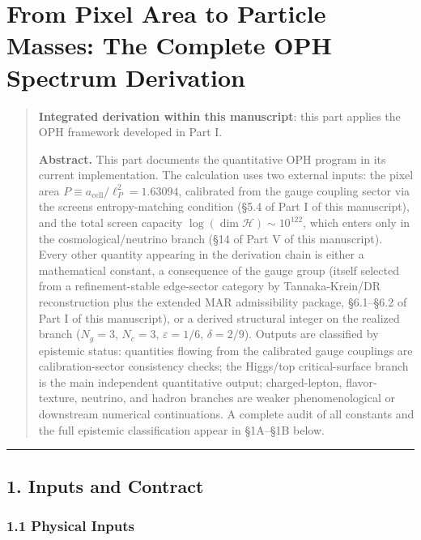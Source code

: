 \section{From Pixel Area to Particle Masses: The Complete OPH Spectrum Derivation}\label{from-pixel-area-to-particle-masses-the-complete-oph-spectrum-derivation}

\begin{quote}
\textbf{Integrated derivation within this manuscript}: this part applies the OPH framework developed in Part I.

\textbf{Abstract.} This part documents the quantitative OPH program in its current implementation. The calculation uses two external inputs: the pixel area \(P \equiv a_{\text{cell}}/\ell_P^2 = 1.63094\), calibrated from the gauge coupling sector via the screen\textquotesingle s entropy-matching condition (§5.4 of Part I of this manuscript), and the total screen capacity \(\log(\dim\mathcal{H}) \sim 10^{122}\), which enters only in the cosmological/neutrino branch (§14 of Part V of this manuscript). Every other quantity appearing in the derivation chain is either a mathematical constant, a consequence of the gauge group (itself selected from a refinement-stable edge-sector category by Tannaka-Krein/DR reconstruction plus the extended MAR admissibility package, §6.1--§6.2 of Part I of this manuscript), or a derived structural integer on the realized branch (\(N_g = 3\), \(N_c = 3\), \(\varepsilon = 1/6\), \(\delta = 2/9\)). Outputs are classified by epistemic status: quantities flowing from the calibrated gauge couplings are calibration-sector consistency checks; the Higgs/top critical-surface branch is the main independent quantitative output; charged-lepton, flavor-texture, neutrino, and hadron branches are weaker phenomenological or downstream numerical continuations. A complete audit of all constants and the full epistemic classification appear in §1A--§1B below.
\end{quote}

\begin{center}\rule{0.5\linewidth}{0.5pt}\end{center}

\subsection{1. Inputs and Contract}\label{1-inputs-and-contract}

\subsubsection{1.1 Physical Inputs}\label{11-physical-inputs}

